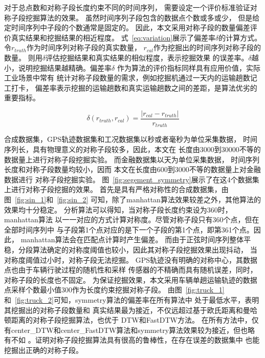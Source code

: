 对于总点数和对称子段长度约束不同的时间序列，
需要设定一个评价标准验证对称子段挖掘算法的效果。
虽然时间序列子段包含的数据点个数或多或少，
但是给定时间序列中子段的个数通常是固定的。
因此，本文采用对称子段的数量偏差评价真实结果和挖掘结果的相近程度。
式~\ref{eq:variation}展示了偏差率$\delta$的计算方式。
令$r_{truth}$作为时间序列对称子段的真实数量，
$r_{cal}$作为挖掘出的时间序列对称子段的数量。
则用$\delta$评估挖掘结果和真实结果的相似程度，表示挖掘效果
的误差率。$\delta$越小，说明挖掘结果越精确。偏差率$\delta$
作为算法的评价指标同样具有应用价值，实际工业场景中常有
统计对称子段数量的需求，例如挖掘机通过一天内的运输趟数记工打卡，
偏差率表示挖掘的运输趟数和真实运输趟数之间的差距，是算法优劣的重要指标。

\begin{equation}
  \delta \left( r_{truth}, r_{cal} \right) = \frac{\left| r_{cal} - r_{truth} \right|}{r_{truth}}
  \label{eq:variation}
\end{equation}

合成数据集，GPS轨迹数据集和工况数据集以秒或者毫秒为单位采集数据，
时间序列长，具有物理意义的对称子段较多，因此，本文在
长度由3000到30000不等的数据量上进行对称子段挖掘实验。
而金融数据集以天为单位采集数据，
时间序列长度和对称子段数量均较小，因而
本文在长度由600到3000不等的数据量上对金融数据进行
对称子段挖掘实验。
图~\ref{fig:segement_symmetry}展示了在这4个数据集上进行对称子段挖掘的效果。
首先是具有严格对称性的合成数据集，由图~\ref{fig:sin_1}和~\ref{fig:sin_2}
可知，除了manhattan算法效果较差之外，其他算法的效果均十分稳定。
分析算法可以得知，当对称子段长度约束设为360时，manhattan算法
以一一对应的方式计算对称度。尽管对称子段只有360个点，但在全部时间序列中
与子段第1个点对应的是下一个子段的第1个点，即第361个点。因此，
manhattan算法会在匹配点计算时产生偏差。
而由于正弦时间序列整体平稳，分段算法确定的对称度阈值也较小，因此其对称子段挖掘效果出现抖动，
当对称度阈值过小时，对称子段无法挖掘。
GPS轨迹没有明确的对称中心，其数据点也由于车辆行驶过程的随机性和采样
传感器的不精确而具有随机误差，同时，对称子段的长度也不固定。
为保证挖掘效果，本文采用车辆单趟运输轨迹的数据点采样个数最小值300作为长度约束挖掘对称子段。
由图~\ref{fig:truck_1}和~\ref{fig:truck_2}可知，symmetry算法的偏差率在所有算法中
处于最低水平，表明其挖掘出的对称子段数量和
真实结果最为接近，不仅远超过基于欧氏距离和曼哈顿距离的对称子段挖掘算法，也优于
DTW和FastDTW方法。
在所有方法中，仅有center\_DTW和center\_FastDTW算法和symmetry算法效果较为接近，但也略有不如
。证明对称子段挖掘算法具有很高的鲁棒性，在存在误差的数据集中
也能挖掘出正确的对称子段。

